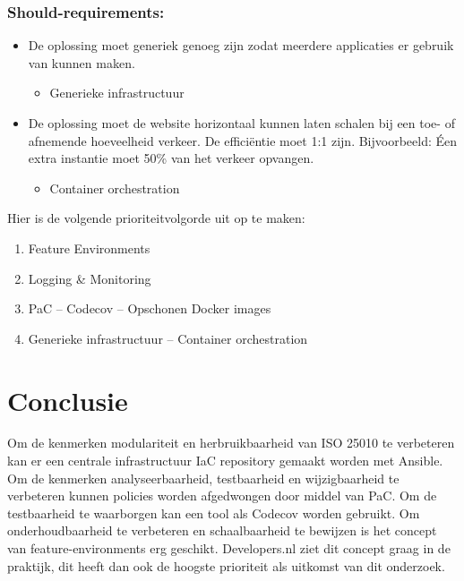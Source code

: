 \subsubsection{Should-requirements:}
\begin{itemize}
	\item De oplossing moet generiek genoeg zijn zodat meerdere applicaties er gebruik van kunnen maken.
	\begin{itemize}
		\item Generieke infrastructuur
	\end{itemize}

	\item De oplossing moet de website horizontaal kunnen laten schalen bij een toe- of afnemende hoeveelheid verkeer. De efficiëntie moet 1:1 zijn. Bijvoorbeeld: Éen extra instantie moet 50\% van het verkeer opvangen.
	\begin{itemize}
		\item Container orchestration
	\end{itemize}
\end{itemize}
Hier is de volgende prioriteitvolgorde uit op te maken:
\begin{enumerate}
    \item Feature Environments
    \item Logging \& Monitoring
    \item PaC -- Codecov -- Opschonen Docker images
    \item Generieke infrastructuur -- Container orchestration
\end{enumerate}

\section{Conclusie}
Om de kenmerken modulariteit en herbruikbaarheid van ISO 25010 te verbeteren kan er een centrale infrastructuur IaC repository gemaakt worden met Ansible. Om de kenmerken analyseerbaarheid, testbaarheid en wijzigbaarheid te verbeteren kunnen policies worden afgedwongen door middel van PaC. Om de testbaarheid te waarborgen kan een tool als Codecov worden gebruikt. Om onderhoudbaarheid te verbeteren en schaalbaarheid te bewijzen is het concept van feature-environments erg geschikt. Developers.nl ziet dit concept graag in de praktijk, dit heeft dan ook de hoogste prioriteit als uitkomst van dit onderzoek.